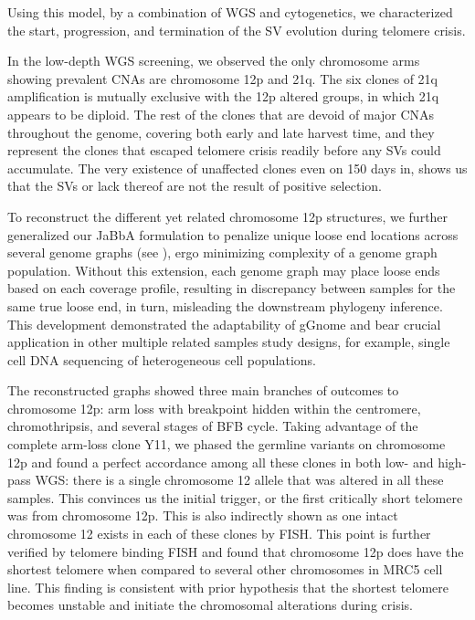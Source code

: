 \documentclass[phd,tocprelim]{cornell}
\begin{document}
Using this model, by a combination of WGS and cytogenetics, we characterized the start, progression, and termination of the SV evolution during telomere crisis. 

In the low-depth WGS screening, we observed the only chromosome arms showing prevalent CNAs are chromosome 12p and 21q. The six clones of 21q amplification is mutually exclusive with the 12p altered groups, in which 21q appears to be diploid. The rest of the clones that are devoid of major CNAs throughout the genome, covering both early and late harvest time, and they represent the clones that escaped telomere crisis readily before any SVs could accumulate. The very existence of unaffected clones even on 150 days in, shows us that the SVs or lack thereof are not the result of positive selection.

To reconstruct the different yet related chromosome 12p structures, we further generalized our JaBbA formulation to penalize unique loose end locations across several genome graphs (see ), ergo minimizing complexity of a genome graph population. Without this extension, each genome graph may place loose ends based on each coverage profile, resulting in discrepancy between samples for the same true loose end, in turn, misleading the downstream phylogeny inference. This development demonstrated the adaptability of gGnome and bear crucial application in other multiple related samples study designs, for example, single cell DNA sequencing of heterogeneous cell populations.

The reconstructed graphs showed three main branches of outcomes to chromosome 12p: arm loss with breakpoint hidden within the centromere, chromothripsis, and several stages of BFB cycle. Taking advantage of the complete arm-loss clone Y11, we phased the germline variants on chromosome 12p and found a perfect accordance among all these clones in both low- and high-pass WGS: there is a single chromosome 12 allele that was altered in all these samples. This convinces us the initial trigger, or the first critically short telomere was from chromosome 12p. This is also indirectly shown as one intact chromosome 12 exists in each of these clones by FISH. This point is further verified by telomere binding FISH and found that chromosome 12p does have the shortest telomere when compared to several other chromosomes in MRC5 cell line. This finding is consistent with prior hypothesis that the shortest telomere becomes unstable and initiate the chromosomal alterations during crisis.
\end{document}
